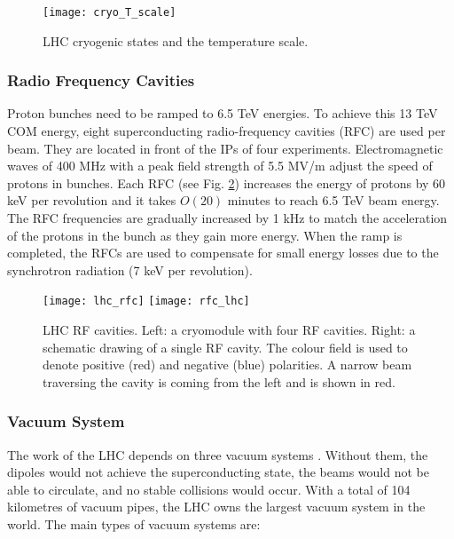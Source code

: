 \begin{normalsize}
\begin{figure}[H]
  \centering
  \texttt{[image: cryo\_T\_scale]}
  \caption{LHC cryogenic states and the temperature scale.}
  \label{cryo_T_scale}
\end{figure}




\subsubsection{Radio Frequency Cavities}\label{sec:rf}


Proton bunches need to be ramped to 6.5 TeV energies. To achieve this 13 TeV COM energy, eight superconducting radio-frequency cavities (RFC) are used per beam. They are located in front of the IPs of four experiments. Electromagnetic waves of 400 MHz with a peak field strength of 5.5 MV/m adjust the speed of protons in bunches. Each RFC (see Fig. \ref{lhc_rfc}) increases the energy of protons by 60 keV per revolution and it takes $O(20)$ minutes to reach 6.5 TeV beam energy. The RFC frequencies are gradually increased by 1 kHz to match the acceleration of the protons in the bunch as they gain more energy. When the ramp is completed, the RFCs are used to compensate for small energy losses due to the synchrotron radiation (7 keV per revolution). 



\begin{figure}[H]
\centering
\texttt{[image: lhc\_rfc]}
\texttt{[image: rfc\_lhc]}
\caption[RF cavities module.]{LHC RF cavities. Left: a cryomodule with four RF cavities. Right: a schematic drawing of a single RF cavity. The colour field is used to denote positive (red) and negative (blue) polarities. A narrow beam traversing the cavity is coming from the left and is shown in red. }
\label{lhc_rfc}
\end{figure}




\subsubsection{Vacuum System}\label{sec:vacuum}




The work of the LHC depends on three vacuum systems \cite{LHC_vacuum}. Without them, the dipoles would not achieve the superconducting state, the beams would not be able to circulate, and no stable collisions would occur. With a total of 104 kilometres of vacuum pipes, the LHC owns the largest vacuum system in the world. The main types of vacuum systems are:


\end{normalsize}

